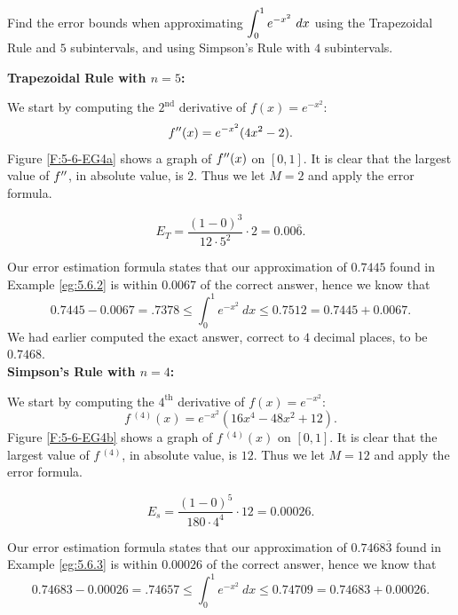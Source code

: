 \begin{example} \label{eg:5.6.4} %
Find the error bounds when approximating $\ds \int_0^1 e^{-x^2}\ dx$ using the Trapezoidal Rule and $5$ subintervals, and using Simpson's Rule with $4$ subintervals.

\solution \noindent \textbf{Trapezoidal Rule with $n=5$:}

We start by computing the $2^\text{nd}$ derivative of $f(x) = e^{-x^2}$: $$f''(x) = e^{-x^2}(4x^2-2).$$ Figure \ref{F:5-6-EG4a} shows a graph of $f''(x)$ on $[0,1]$. It is clear that the largest value of $f''$, in absolute value, is $2$. Thus we let $M=2$ and apply the error formula.

$$E_T = \frac{(1-0)^3}{12\cdot 5^2}\cdot 2 = 0.00\overline{6}.$$

Our error estimation formula states that our approximation of $0.7445$ found in Example \ref{eg:5.6.2} is within $0.0067$ of the correct answer, hence we know that
$$0.7445-0.0067 = .7378 \leq \int_0^1e^{-x^2}\ dx \leq 0.7512 = 0.7445 + 0.0067.$$ We had earlier computed the exact answer, correct to $4$ decimal places, to be $0.7468$.\\

\noindent\textbf{Simpson's Rule with $n=4$:}

We start by computing the $4^\text{th}$ derivative of $f(x) = e^{-x^2}$: $$f\,^{(4)}(x) = e^{-x^2}(16x^4-48x^2+12).$$ Figure \ref{F:5-6-EG4b} shows a graph of $f\,^{(4)}(x)$ on $[0,1]$. It is clear that the largest value of $f\,^{(4)}$, in absolute value, is $12$. Thus we let $M=12$ and apply the error formula.

$$E_s = \frac{(1-0)^5}{180\cdot 4^4}\cdot 12 = 0.00026.$$

Our error estimation formula states that our approximation of $0.7468\overline{3}$ found in Example \ref{eg:5.6.3} is within $0.00026$ of the correct answer, hence we know that
$$0.74683-0.00026 = .74657 \leq \int_0^1e^{-x^2}\ dx \leq 0.74709 = 0.74683 + 0.00026.$$ 
\end{example}

